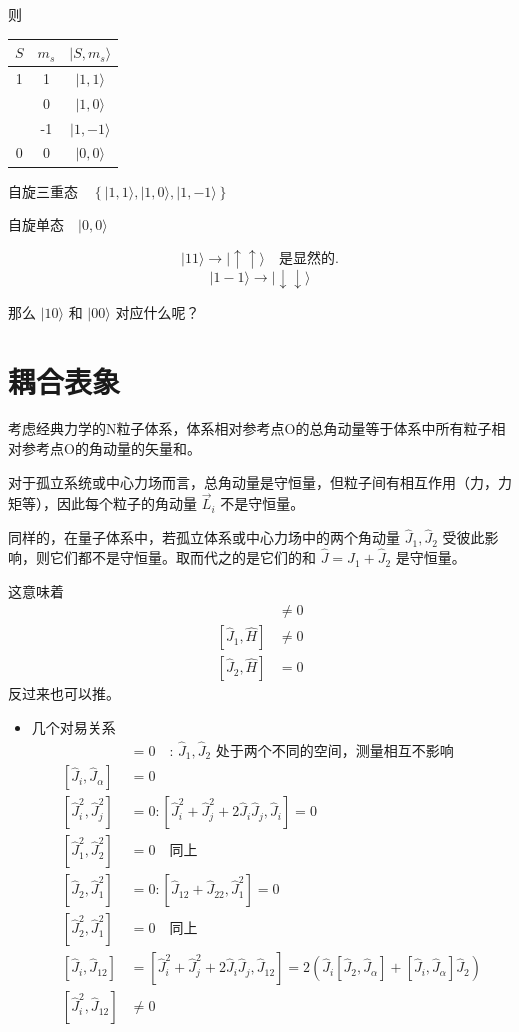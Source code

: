 \documentclass[lang=cn,10pt]{elegantbook}
\begin{document}
则

\begin{tabular}{c|c|c}
	$S$ & $m_s$ & $|S, m_s\rangle$ \\
	\hline
	1 & 1 & $|1, 1\rangle$ \\
	& 0 & $|1, 0\rangle$ \\
	& -1 & $|1, -1\rangle$ \\
	0 & 0 & $|0, 0\rangle$ \\
\end{tabular}

$\text{自旋三重态} \quad \left\{ |1, 1\rangle, |1, 0\rangle, |1, -1\rangle \right\}$

$\text{自旋单态} \quad |0, 0\rangle$

\[
|1 1\rangle \longrightarrow |\uparrow \uparrow\rangle \quad \text{是显然的.}
\]
\[
|1 -1\rangle \longrightarrow |\downarrow \downarrow\rangle
\]

那么 $|1 0\rangle$ 和 $|0 0\rangle$ 对应什么呢？
\section{耦合表象}
考虑经典力学的N粒子体系，体系相对参考点O的总角动量等于体系中所有粒子相对参考点O的角动量的矢量和。

对于孤立系统或中心力场而言，总角动量是守恒量，但粒子间有相互作用（力，力矩等），因此每个粒子的角动量 $\vec{L}_i$ 不是守恒量。

同样的，在量子体系中，若孤立体系或中心力场中的两个角动量 $\hat{J}_1, \hat{J}_2$ 受彼此影响，则它们都不是守恒量。取而代之的是它们的和 $\hat{J} = \hat{J}_1 + \hat{J}_2$ 是守恒量。

这意味着
\begin{align*}
	[\hat{J}, \hat{H}] &\neq 0 \\
	[\hat{J}_1, \hat{H}] &\neq 0 \\
	[\hat{J}_2, \hat{H}] &= 0
\end{align*}
反过来也可以推。

\begin{itemize}
	\item 几个对易关系
	\begin{align*}
		[\hat{J}_1, \hat{J}_2] &= 0 \quad \text{: } \hat{J}_1, \hat{J}_2 \text{ 处于两个不同的空间，测量相互不影响} \\
		[\hat{J}_i, \hat{J}_\alpha] &= 0 \\
		[\hat{J}_i^2, \hat{J}_j^2] &= 0 : [\hat{J}_i^2 + \hat{J}_j^2 + 2\hat{J}_i\hat{J}_j, \hat{J}_i] = 0 \\
		[\hat{J}_1^2, \hat{J}_2^2] &= 0 \quad \text{同上} \\
		[\hat{J}_2, \hat{J}_1^2] &= 0 : [\hat{J}_{12} + \hat{J}_{22}, \hat{J}_1^2] = 0 \\
		[\hat{J}_2^2, \hat{J}_1^2] &= 0 \quad \text{同上} \\
		[\hat{J}_i, \hat{J}_{12}] &= [\hat{J}_i^2 + \hat{J}_j^2 + 2\hat{J}_i\hat{J}_j, \hat{J}_{12}] = 2(\hat{J}_i[\hat{J}_2, \hat{J}_\alpha] + [\hat{J}_i, \hat{J}_\alpha]\hat{J}_2) \\
		[\hat{J}_i^2, \hat{J}_{12}] &\neq 0
	\end{align*}
\end{itemize}
\end{document}
